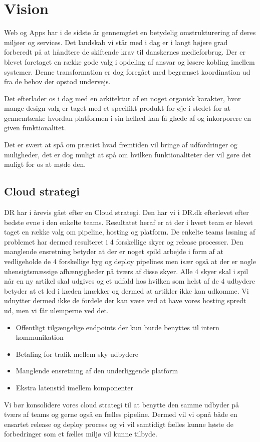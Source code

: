 \documentclass{article}
\begin{document}
\section{Vision}
Web og Apps har i de sidste år gennemgået en betydelig omstrukturering af deres miljøer og services. Det landskab vi står med i dag er i langt højere grad forberedt på at håndtere de skiftende krav til danskernes medieforbrug. Der er blevet foretaget en række gode valg i opdeling af ansvar og løsere kobling imellem systemer. Denne transformation er dog foregået med begrænset koordination ud fra de behov der opstod undervejs. 

Det efterlader os i dag med en arkitektur af en noget organisk karakter, hvor mange design valg er taget med et specifikt produkt for øje i stedet for at gennemtænke hvordan platformen i sin helhed kan få glæde af og inkorporere en given funktionalitet.

Det er svært at spå om præcist hvad fremtiden vil bringe af udfordringer og muligheder, det er dog muligt at spå om hvilken funktionaliteter der vil gøre det muligt for os at møde den.  

\subsection{Cloud strategi}
DR har i årevis gået efter en Cloud strategi. Den har vi i DR.dk efterlevet efter bedste evne i den enkelte teams. Resultatet heraf er at der i hvert team er blevet taget en række valg om pipeline, hosting og platform.
De enkelte teams løsning af problemet har dermed resulteret i 4 forskellige skyer og release processer. Den manglende ensretning betyder at der er noget spild arbejde i form af at vedligeholde de 4 forskellige byg og deploy pipelines men især også at der er nogle uhensigtsmæssige afhængigheder på tværs af disse skyer. 
Alle 4 skyer skal i spil når en ny artikel skal udgives og et udfald hos hvilken som helst af de 4 udbydere betyder at et led i kæden knækker og dermed at artikler ikke kan udkomme. Vi udnytter dermed ikke de fordele der kan være ved at have vores hosting spredt ud, men vi får ulemperne ved det.
\begin{itemize}
\item Offentligt tilgængelige endpoints der kun burde benyttes til intern kommunikation
\item Betaling for trafik mellem sky udbydere
\item Manglende ensretning af den underliggende platform
\item Ekstra latenstid imellem komponenter 
\end{itemize}
Vi bør konsolidere vores cloud strategi til at benytte den samme udbyder på tværs af teams og gerne også en fælles pipeline. Dermed vil vi opnå både en ensartet release og deploy process og vi vil samtidigt fælles kunne høste de forbedringer som et fælles miljø vil kunne tilbyde.
\end{document}
